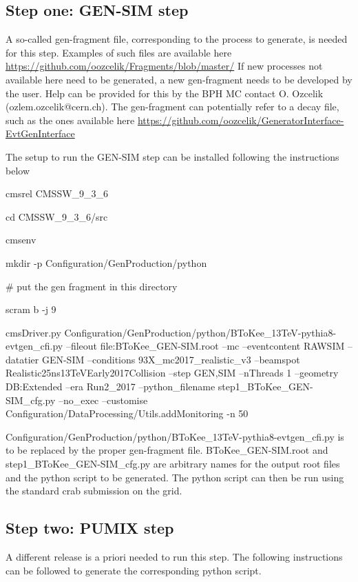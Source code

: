 \documentclass[a4paper,11pt]{article}
\begin{document}
\subsection{Step one: GEN-SIM step}

A so-called gen-fragment file, corresponding to the process to generate, is needed for this step. Examples of such files are available here
\url{https://github.com/oozcelik/Fragments/blob/master/}
If new processes not available here need to be generated, a new gen-fragment needs to be developed by the user.
Help can be provided for this by the BPH MC contact O. Ozcelik (ozlem.ozcelik@cern.ch).
The gen-fragment can potentially refer to a decay file, such as the ones available here
\url{https://github.com/oozcelik/GeneratorInterface-EvtGenInterface}

The setup to run the GEN-SIM step can be installed following the instructions below

\bigbreak
cmsrel CMSSW\_9\_3\_6

cd CMSSW\_9\_3\_6/src

cmsenv

mkdir -p Configuration/GenProduction/python

\# put the gen fragment in this directory

scram b -j 9

cmsDriver.py Configuration/GenProduction/python/BToKee\_13TeV-pythia8-evtgen\_cfi.py --fileout file:BToKee\_GEN-SIM.root --mc --eventcontent RAWSIM --datatier GEN-SIM --conditions 93X\_mc2017\_realistic\_v3 --beamspot Realistic25ns13TeVEarly2017Collision --step GEN,SIM --nThreads 1 --geometry DB:Extended --era Run2\_2017 --python\_filename step1\_BToKee\_GEN-SIM\_cfg.py --no\_exec --customise Configuration/DataProcessing/Utils.addMonitoring -n 50

\bigbreak

Configuration/GenProduction/python/BToKee\_13TeV-pythia8-evtgen\_cfi.py is to be replaced by the proper gen-fragment file.
BToKee\_GEN-SIM.root and step1\_BToKee\_GEN-SIM\_cfg.py are arbitrary names for the output root files and the python script to be generated.
The python script can then be run using the standard crab submission on the grid.


\subsection{Step two: PUMIX step}

A different release is a priori needed to run this step. The following instructions can be followed to generate the corresponding python script.
\end{document}
